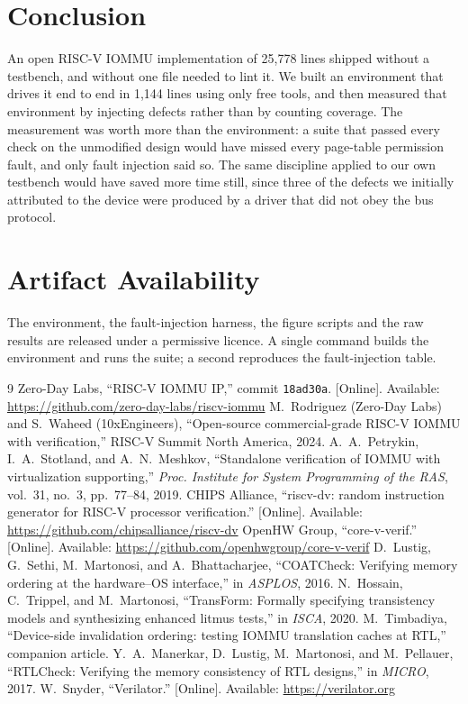 \documentclass[journal]{IEEEtran}
\begin{document}
\section{Conclusion}
An open RISC-V IOMMU implementation of 25{,}778 lines shipped without a
testbench, and without one file needed to lint it. We built an environment that
drives it end to end in 1{,}144 lines using only free tools, and then measured
that environment by injecting defects rather than by counting coverage. The
measurement was worth more than the environment: a suite that passed every check
on the unmodified design would have missed every page-table permission fault,
and only fault injection said so. The same discipline applied to our own
testbench would have saved more time still, since three of the defects we
initially attributed to the device were produced by a driver that did not obey
the bus protocol.

\section*{Artifact Availability}
The environment, the fault-injection harness, the figure scripts and the raw
results are released under a permissive licence. A single command builds the
environment and runs the suite; a second reproduces the fault-injection table.

\begin{thebibliography}{9}
 Zero-Day Labs, ``RISC-V IOMMU IP,'' commit \texttt{18ad30a}.
[Online]. Available: \url{https://github.com/zero-day-labs/riscv-iommu}
 M.~Rodriguez (Zero-Day Labs) and S.~Waheed (10xEngineers),
``Open-source commercial-grade RISC-V IOMMU with verification,'' RISC-V Summit
North America, 2024.
 A.~A.~Petrykin, I.~A.~Stotland, and A.~N.~Meshkov, ``Standalone
verification of IOMMU with virtualization supporting,'' \emph{Proc. Institute
for System Programming of the RAS}, vol.~31, no.~3, pp.~77--84, 2019.
 CHIPS Alliance, ``riscv-dv: random instruction generator for
RISC-V processor verification.'' [Online]. Available:
\url{https://github.com/chipsalliance/riscv-dv}
 OpenHW Group, ``core-v-verif.'' [Online]. Available:
\url{https://github.com/openhwgroup/core-v-verif}
 D.~Lustig, G.~Sethi, M.~Martonosi, and A.~Bhattacharjee,
``COATCheck: Verifying memory ordering at the hardware--OS interface,'' in
\emph{ASPLOS}, 2016.
 N.~Hossain, C.~Trippel, and M.~Martonosi,
``TransForm: Formally specifying transistency models and synthesizing enhanced
litmus tests,'' in \emph{ISCA}, 2020.
 M.~Timbadiya, ``Device-side invalidation ordering: testing
IOMMU translation caches at RTL,'' companion article.
 Y.~A.~Manerkar, D.~Lustig, M.~Martonosi, and M.~Pellauer,
``RTLCheck: Verifying the memory consistency of RTL designs,'' in \emph{MICRO},
2017.
 W.~Snyder, ``Verilator.'' [Online]. Available:
\url{https://verilator.org}
\end{thebibliography}
\end{document}
